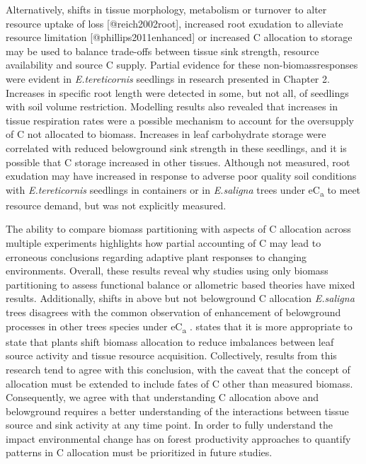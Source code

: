 \documentclass[a4paper]{article}\usepackage[]{graphicx}\usepackage[]{color}
\begin{document}
Alternatively, shifts in tissue morphology, metabolism or turnover to alter resource uptake of loss [@reich2002root], increased root exudation to alleviate resource limitation [@phillips2011enhanced] or increased C allocation to storage \citep{sala2012carbon, dietze2014nonstructural} may be used to balance trade-offs between tissue sink strength, resource availability and source C supply. Partial evidence for these \textquotesingle non-biomass\textquotesingle responses were evident in \textit{E.tereticornis} seedlings in research presented in Chapter 2. Increases in specific root length were detected in some, but not all, of seedlings with soil volume restriction. Modelling results also revealed that increases in tissue respiration rates were a possible mechanism to account for the oversupply of C not allocated to biomass. Increases in leaf carbohydrate storage were correlated with reduced belowground sink strength in these seedlings, and it is possible that C storage increased in other tissues. Although not measured, root exudation may have increased in response to adverse poor quality soil conditions with \textit{E.tereticornis} seedlings in containers or in \textit{E.saligna} trees under eC\textsubscript{a} to meet resource demand, but was not explicitly measured.

The ability to compare biomass partitioning with aspects of C allocation across multiple experiments highlights how partial accounting of C may lead to erroneous conclusions regarding adaptive plant responses to changing environments. Overall, these results reveal why studies using only biomass partitioning to assess functional balance or allometric based theories have mixed results. Additionally, shifts in above but not belowground C allocation \textit{E.saligna} trees disagrees with the common observation of enhancement of belowground processes in other trees species under eC\textsubscript{a} \citep[see]{palmroth2006aboveground, iversen2014terrestrial}. \citet{shipley2002balanced} states that it is more appropriate to state that plants shift biomass allocation to reduce imbalances between leaf source activity and tissue resource acquisition. Collectively, results from this research tend to agree with this conclusion, with the caveat that the concept of allocation must be extended to include fates of C other than measured biomass. Consequently, we agree with \citet{poorter2012biomass} that understanding C allocation above and belowground requires a better understanding of the interactions between tissue source and sink activity at any time point. In order to fully understand the impact environmental change has on forest productivity approaches to quantify patterns in C allocation must be prioritized in future studies.
\end{document}
